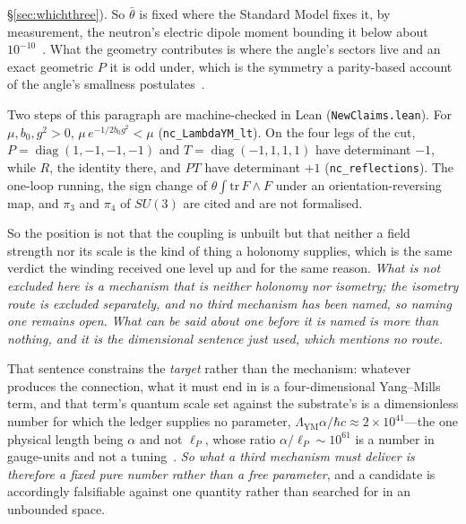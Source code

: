 \documentclass[11pt]{article}
\begin{document}
\S\ref{sec:whichthree}). So $\bar\theta$ is fixed where the Standard Model fixes it, by measurement, the neutron's electric dipole moment bounding it below about $10^{-10}$~\cite{Abel2020}. What the geometry contributes is where the angle's sectors live and an exact geometric $P$ it is odd under, which is the symmetry a parity-based account of the angle's smallness postulates~\cite{BabuMohapatra1990}.

Two steps of this paragraph are machine-checked in Lean (\texttt{NewClaims.lean}). For $\mu,b_{0},g^{2}>0$, $\mu\,e^{-1/2b_{0}g^{2}}<\mu$ (\texttt{nc\_LambdaYM\_lt}). On the four legs of the cut, $P=\operatorname{diag}(1,-1,-1,-1)$ and $T=\operatorname{diag}(-1,1,1,1)$ have determinant $-1$, while $R$, the identity there, and $PT$ have determinant $+1$ (\texttt{nc\_reflections}). The one-loop running, the sign change of $\theta\int\mathrm{tr}\,F\wedge F$ under an orientation-reversing map, and $\pi_{3}$ and $\pi_{4}$ of $SU(3)$ are cited and are not formalised.

So the position is not that the coupling is unbuilt but that neither a field strength nor its scale is the kind of thing a holonomy supplies, which is the same verdict the winding received one level up and for the same reason. \emph{What is not excluded here is a mechanism that is neither holonomy nor isometry; the isometry route is excluded separately, and no third mechanism has been named, so naming one remains open.} \emph{What can be said about one before it is named is more than nothing, and it is the dimensional sentence just used, which mentions no route.} 

That sentence constrains the \emph{target} rather than the mechanism: whatever produces the connection, what it must end in is a four-dimensional Yang--Mills term, and that term's quantum scale set against the substrate's is a dimensionless number for which the ledger supplies no parameter, $\Lambda_{\mathrm{YM}}\alpha/\hbar c\approx2\times10^{41}$---the one physical length being $\alpha$ and not $\ell_P$, whose ratio $\alpha/\ell_P\sim10^{61}$ is a number in gauge-units and not a tuning~\cite{JanzenGeometricCore}. \emph{So what a third mechanism must deliver is therefore a fixed pure number rather than a free parameter}, and a candidate is accordingly falsifiable against one quantity rather than searched for in an unbounded space. 
\end{document}
